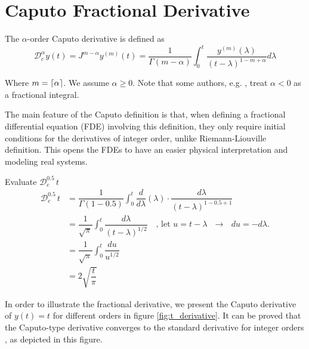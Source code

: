 \section{Caputo Fractional Derivative}

The $\alpha$-order Caputo derivative is defined as 
\begin{equation}
    \mathcal{D}_c^\alpha y(t) = J^{m-\alpha}y^{(m)}(t) = \dfrac{1}{\Gamma(m-\alpha)}\int_0^t \dfrac{y^{(m)}(\lambda)}{(t-\lambda)^{1-m+\alpha}}d\lambda
\end{equation}

Where $m = \lceil\alpha\rceil$. We assume $\alpha\geq0$. Note that some authors, e.g. \cite{kisela2008fractional}, treat $\alpha<0$ as a fractional integral. 

The main feature of the Caputo definition is that, when defining a fractional differential equation (FDE) involving this definition, they only require initial conditions for the derivatives of integer order, unlike Riemann-Liouville definition. This opens the FDEs to have an easier physical interpretation and modeling real systems.
\begin{exmp}
    Evaluate $\mathcal{D}_c^{0.5}\,t$
    \begin{align*}
      \mathcal{D}_c^{0.5}\,t &= \dfrac{1}{\Gamma(1-0.5)}\int_0^t \dfrac{d}{d\lambda}(\lambda)\cdot\dfrac{d\lambda}{(t-\lambda)^{1-0.5+1}}\\
      &= \dfrac{1}{\sqrt{\pi}}\int_0^t \dfrac{d\lambda}{(t-\lambda)^{1/2}}\quad\text{, let $u=t-\lambda$ $\rightarrow$ $du=-d\lambda$.}\\
      &= \dfrac{1}{\sqrt{\pi}}\int_0^t \dfrac{du}{u^{1/2}}\\
      &=2\sqrt{\dfrac{t}{\pi}}
    \end{align*}
\end{exmp}
    In order to illustrate the fractional derivative, we present the Caputo derivative of $y(t)=t$ for different orders in figure \ref{fig:t_derivative}. It can be proved that the Caputo-type derivative converges to the standard derivative for integer orders \cite{ishteva2005properties}, as depicted in this figure.
    
